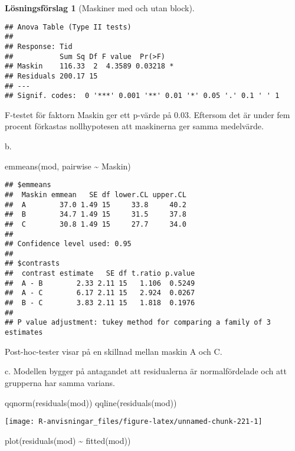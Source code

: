 \documentclass[
]{book}
\newenvironment{Shaded}{\begin{snugshade}}{\end{snugshade}}
\newcommand{\FunctionTok}[1]{\textcolor[rgb]{0.00,0.00,0.00}{#1}}
\newcommand{\NormalTok}[1]{#1}
\newcommand{\SpecialCharTok}[1]{\textcolor[rgb]{0.00,0.00,0.00}{#1}}
\theoremstyle{definition}
\theoremstyle{definition}
\theoremstyle{definition}
\theoremstyle{definition}
\newtheorem{hypothesis}{Lösningsförslag}[chapter]
\theoremstyle{remark}
\begin{document}
\begin{hypothesis}[Maskiner med och utan block]
\begin{verbatim}
## Anova Table (Type II tests)
## 
## Response: Tid
##           Sum Sq Df F value  Pr(>F)  
## Maskin    116.33  2  4.3589 0.03218 *
## Residuals 200.17 15                  
## ---
## Signif. codes:  0 '***' 0.001 '**' 0.01 '*' 0.05 '.' 0.1 ' ' 1
\end{verbatim}

F-testet för faktorn Maskin ger ett p-värde på 0.03. Eftersom det är under fem procent förkastas nollhypotesen att maskinerna ger samma medelvärde.

b.

\begin{Shaded}
\begin{Highlighting}[]
\FunctionTok{emmeans}\NormalTok{(mod, pairwise }\SpecialCharTok{\textasciitilde{}}\NormalTok{ Maskin)}
\end{Highlighting}
\end{Shaded}

\begin{verbatim}
## $emmeans
##  Maskin emmean   SE df lower.CL upper.CL
##  A        37.0 1.49 15     33.8     40.2
##  B        34.7 1.49 15     31.5     37.8
##  C        30.8 1.49 15     27.7     34.0
## 
## Confidence level used: 0.95 
## 
## $contrasts
##  contrast estimate   SE df t.ratio p.value
##  A - B        2.33 2.11 15   1.106  0.5249
##  A - C        6.17 2.11 15   2.924  0.0267
##  B - C        3.83 2.11 15   1.818  0.1976
## 
## P value adjustment: tukey method for comparing a family of 3 estimates
\end{verbatim}

Post-hoc-tester visar på en skillnad mellan maskin A och C.

c. Modellen bygger på antagandet att residualerna är normalfördelade och att grupperna har samma varians.

\begin{Shaded}
\begin{Highlighting}[]
\FunctionTok{qqnorm}\NormalTok{(}\FunctionTok{residuals}\NormalTok{(mod))}
\FunctionTok{qqline}\NormalTok{(}\FunctionTok{residuals}\NormalTok{(mod))}
\end{Highlighting}
\end{Shaded}

\begin{center}\texttt{[image: R-anvisningar\_files/figure-latex/unnamed-chunk-221-1]} \end{center}

\begin{Shaded}
\begin{Highlighting}[]
\FunctionTok{plot}\NormalTok{(}\FunctionTok{residuals}\NormalTok{(mod) }\SpecialCharTok{\textasciitilde{}} \FunctionTok{fitted}\NormalTok{(mod))}
\end{Highlighting}
\end{Shaded}


\end{hypothesis}
\end{document}
